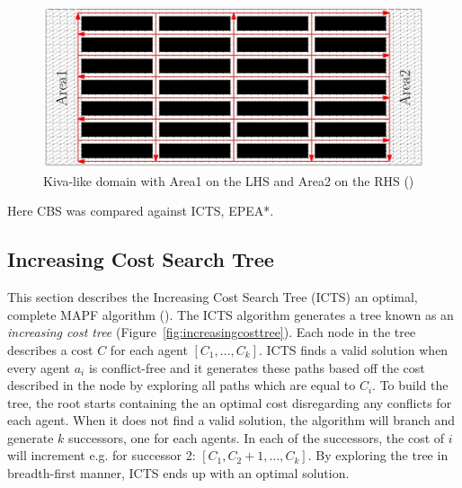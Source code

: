\documentclass[a4paper,11pt]{article}
\begin{document}
\begin{figure}[!htb]
	\centering
	\centering
	\includegraphics[width=0.9\linewidth]{graphics/ecbskivadomain}
	\caption{Kiva-like domain with Area1 on the LHS and Area2 on the RHS (\cite{cohen2016improved})}
	\label{fig:cbskivadomain}
\end{figure}


Here CBS was compared against ICTS, EPEA*.

\subsection{Increasing Cost Search Tree}
This section describes the Increasing Cost Search Tree (ICTS) an optimal, complete MAPF algorithm (\cite{sharon2011increasing}). The ICTS algorithm generates a tree known as an \textit{increasing cost tree} (Figure~\ref{fig:increasingcosttree}). Each node in the tree describes a cost $C$ for each agent $[C_1,\dots,C_k]$. ICTS finds a valid solution when every agent $a_i$ is conflict-free and it generates these paths based off the cost described in the node by exploring all paths which are equal to $C_i$.  To build the tree, the root starts containing the an optimal cost disregarding any conflicts for each agent. When it does not find a valid solution, the algorithm will branch and generate $k$ successors, one for each agents. In each of the successors, the cost of $i$ will increment e.g. for successor 2: $[C_1,C_{2}+1,\dots,C_k]$. By exploring the tree in breadth-first manner, ICTS ends up with an optimal solution.
\end{document}
